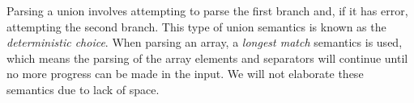 Parsing a union involves attempting to parse the first branch and, if it has error, attempting
the second branch. This type of union semantics is known as the {\em deterministic choice}. 
When parsing an array, a {\em longest match} semantics is used, which means the parsing of
the array elements and separators will continue until no more progress can be made in
the input. We will not elaborate these semantics due to lack of space.


%

